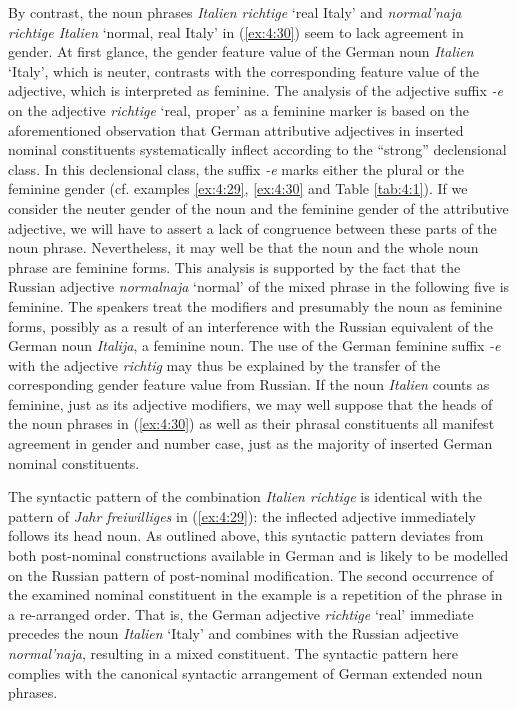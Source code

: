 \begin{sloppypar}
By contrast, the noun phrases \textit{Italien richtige} `real Italy' and \textit{normal'naja richtige Italien} `normal, real Italy' in (\ref{ex:4:30}) seem to lack agreement in gender. At first glance, the gender feature value of the German noun \textit{Italien} `Italy', which is neuter, contrasts with the corresponding feature value of the adjective, which is interpreted as feminine. The analysis of the adjective suffix \textit{-e} on the adjective \textit{richtige} `real, proper' as a feminine marker is based on the aforementioned observation that German attributive adjectives in inserted nominal constituents systematically inflect according to the “strong” declensional class. In this declensional class, the suffix \textit{-e} marks either the plural or the feminine gender (cf. examples \ref{ex:4:29}, \ref{ex:4:30} and Table \ref{tab:4:1}). If we consider the neuter gender of the noun and the feminine gender of the attributive adjective, we will have to assert a lack of congruence between these parts of the noun phrase. Nevertheless, it may well be that the noun and the whole noun phrase are feminine forms. This analysis is supported by the fact that the Russian adjective \textit{normalnaja} `normal' of the mixed phrase in the following five is feminine. The speakers treat the modifiers and presumably the noun as feminine forms, possibly as a result of an interference with the Russian equivalent of the German noun \textit{Italija}, a feminine noun. The use of the German feminine suffix \textit{-e} with the adjective \textit{richtig} may thus be explained by the transfer of the corresponding gender feature value from Russian. If  the noun \textit{Italien} counts as feminine, just as its adjective modifiers, we may well suppose that the heads of the noun phrases in (\ref{ex:4:30}) as well as their phrasal constituents all manifest agreement in gender and number case, just as the majority of inserted German nominal constituents.
\end{sloppypar}

The syntactic pattern of the combination \textit{Italien richtige} is identical with the pattern of \textit{Jahr freiwilliges} in (\ref{ex:4:29}): the inflected adjective immediately follows its head noun. As outlined above, this syntactic pattern deviates from both post-nominal constructions available in German and is likely to be modelled on the Russian pattern of post-nominal modification. The second occurrence of the examined nominal constituent in the example is a repetition of the phrase in a re-arranged order. That is, the German adjective \textit{richtige} `real' immediate precedes the noun \textit{Italien} `Italy' and combines with the Russian adjective \textit{normal'naja}, resulting in a mixed constituent. The syntactic pattern here complies with the canonical syntactic arrangement of German extended noun phrases.

